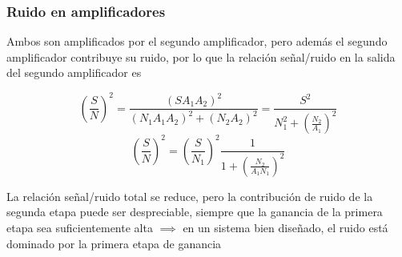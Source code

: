 \documentclass{beamer}
\begin{document}
\begin{frame}
\frametitle{Ruido en amplificadores}
%

Ambos son amplificados por el segundo amplificador, pero además el segundo 
amplificador contribuye su ruido, por lo que la relación señal/ruido en la 
salida del segundo amplificador es

$$\left(\frac{S}{N}\right)^2 = \frac{(S A_1 A_2)^2}{(N_1 A_1 A_2)^2 + (N_2
A_2)^2} = \frac{S^2}{N_1^2 + \left(\frac{N_2}{A_1}\right)^2}$$
$$\left(\frac{S}{N}\right)^2 = \left(\frac{S}{N_1}\right)^2
\frac{1}{1 + \left(\frac{N_2}{A_1 N_1}\right)^2}$$

La relación señal/ruido total se reduce, pero la contribución de ruido de la
segunda etapa puede ser despreciable, siempre que la ganancia de la primera
etapa sea suficientemente alta $\implies$ \alert{en un sistema bien diseñado, el
ruido está dominado por la primera etapa de ganancia}
\end{frame}
\end{document}

